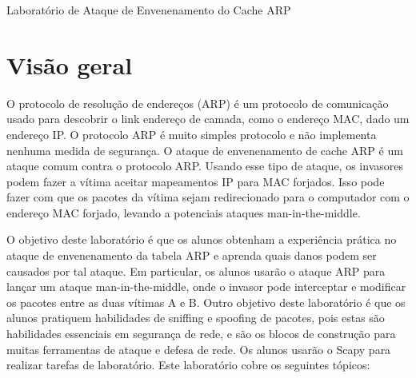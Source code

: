 




\newcommand{\arpFigs}{./Figs}



	
	
	
	\begin{center}
		{\LARGE Laboratório de Ataque de Envenenamento do Cache ARP}
	\end{center}
	
	
	
	
	\section{Visão geral}
	
	
	O protocolo de resolução de endereços (ARP) é um protocolo de comunicação usado para descobrir o link
	endereço de camada, como o endereço MAC, dado um endereço IP. O protocolo ARP é muito simples
	protocolo e não implementa nenhuma medida de segurança.
	O ataque de envenenamento de cache ARP é um ataque comum contra o protocolo ARP.
	Usando esse tipo de ataque, os invasores podem fazer a vítima aceitar
	mapeamentos IP para MAC forjados. Isso pode fazer com que os pacotes da vítima sejam
	redirecionado para o computador com o endereço MAC forjado, levando a
	potenciais ataques man-in-the-middle.
	
	
	O objetivo deste laboratório é que os alunos obtenham a experiência prática no ataque de envenenamento da tabela ARP e aprenda quais danos podem ser causados ​​por tal ataque.
	Em particular, os alunos usarão o ataque ARP para lançar um ataque man-in-the-middle,
	onde o invasor pode interceptar e modificar os pacotes entre as duas vítimas A e B.
	Outro objetivo deste laboratório é que os alunos pratiquem
	habilidades de sniffing e spoofing de pacotes, pois estas são
	habilidades essenciais em segurança de rede, e são os blocos de construção
	para muitas ferramentas de ataque e defesa de rede.
	Os alunos usarão o Scapy para realizar tarefas de laboratório.
	Este laboratório cobre os seguintes tópicos:
	
